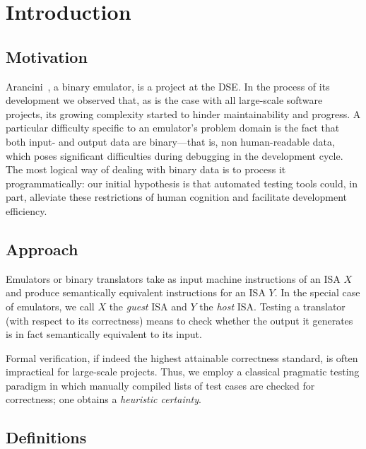 
\chapter{Introduction}\label{chapter:introduction}

\section{Motivation}

Arancini~\cite{arancini?}, a binary emulator, is a project at the \ac{DSE}. In the process of its development we
observed that, as is the case with all large-scale software projects, its growing complexity started to hinder
maintainability and progress. A particular difficulty specific to an emulator's problem domain is the fact that both
input- and output data are binary---that is, non human-readable data, which poses significant difficulties during
debugging in the development cycle. The most logical way of dealing with binary data is to process it programmatically:
our initial hypothesis is that automated testing tools could, in part, alleviate these restrictions of human cognition
and facilitate development efficiency.

\section{Approach}

Emulators or binary translators take as input machine instructions of an \ac{ISA} $X$ and produce semantically
equivalent instructions for an \ac{ISA} $Y$. In the special case of emulators, we call $X$ the \textit{guest} \ac{ISA}
and $Y$ the \textit{host} \ac{ISA}. Testing a translator (with respect to its correctness) means to check whether the
output it generates is in fact semantically equivalent to its input.

Formal verification, if indeed the highest attainable correctness standard, is often impractical for large-scale
projects. Thus, we employ a classical pragmatic testing paradigm in which manually compiled lists of test cases are
checked for correctness; one obtains a \textit{heuristic certainty}.

\section{Definitions}

